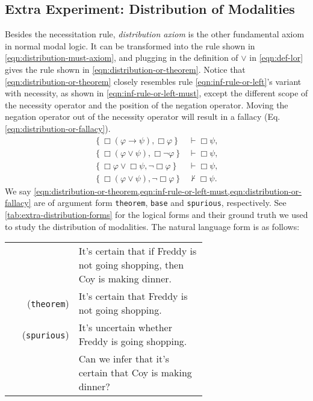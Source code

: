 \subsection{Extra Experiment: Distribution of Modalities}

Besides the necessitation rule, \textit{distribution axiom} is the other fundamental axiom in normal modal logic.
It can be transformed into the rule shown in \cref{eqn:distribution-must-axiom},
and plugging in the definition of $\lor$ in \cref{eqn:def-lor} gives the rule shown in \cref{eqn:distribution-or-theorem}.
Notice that \cref{eqn:distribution-or-theorem} closely resembles rule \ref{eqn:inf-rule-or-left}'s variant with necessity, as shown in \cref{eqn:inf-rule-or-left-must},
except the different scope of the necessity operator and the position of the negation operator.
Moving the negation operator out of the necessity operator will result in a fallacy (Eq. \ref{eqn:distribution-or-fallacy}).
\noindent
\begin{align}
    \left\{\Box(\varphi \to \psi), \Box \varphi\right\} &\vdash \Box \psi, 
    \label{eqn:distribution-must-axiom} \\
    \left\{\Box(\varphi \lor \psi), \Box \lnot \varphi\right\} &\vdash \Box \psi \label{eqn:distribution-or-theorem}, \\
    \left\{\Box \varphi \lor \Box \psi, \lnot \Box \varphi\right\} &\vdash \Box \psi \label{eqn:inf-rule-or-left-must}, \\
    \left\{\Box(\varphi \lor \psi), \lnot \Box \varphi\right\} &\nvdash \Box \psi \label{eqn:distribution-or-fallacy}.
\end{align}
\noindent
We say \cref{eqn:distribution-or-theorem,eqn:inf-rule-or-left-must,eqn:distribution-or-fallacy} are of argument form \texttt{theorem}, \texttt{base} and \texttt{spurious}, respectively.
See \cref{tab:extra-distribution-forms} for the logical forms and their ground truth we used to study the distribution of modalities.
The natural language form is as follows:
\begin{table}[H]
    \small
    \begin{tabular}{rp{0.65\linewidth}}
    & It's certain that if Freddy is not going shopping, then Coy is making dinner.\\
    (\texttt{theorem}) & It's certain that Freddy is not going shopping.\\
    (\texttt{spurious}) & It's uncertain whether Freddy is going shopping.\\
    & Can we infer that it's certain that Coy is making dinner?\\
    \end{tabular}
\end{table}


